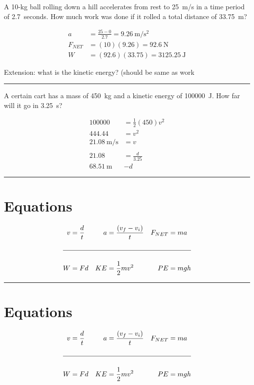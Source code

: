 \documentclass[12pt]{exam}
\begin{document}

\def\mystrut{\protect\rule[-2.2ex]{0ex}{2.2ex}} 
\qformat{ \textbf{Task \#\thequestion}
  \ifthenelse{\equal{\thequestion}{\thequestiontitle}}
    {}
    {: \emph{\thequestiontitle}}
  \mystrut  \hfill}


\begin{questions}


\question
  A 10-kg ball rolling down a hill accelerates from rest to 25~m/s in a time period of 2.7~seconds.  How much work was done if it rolled a total distance of 33.75~m?


  \begin{solution}
    \begin{align*}
      a &= \frac {25-0}{2.7} 
         = \SI{9.26}{\meter\per\second^2} \\
      F_{NET} &= (10)(9.26)
               = \SI{92.6}{\newton} \\
      W &= (92.6)(33.75)
         = \SI{3125.25}{\joule}
    \end{align*}


    Extension: what is the kinetic energy?  (should be same as work
  \end{solution}


\vs \hrule \vs

\question
  A certain cart has a mass of 450~kg and a kinetic energy of \SI{100000}{\joule}.  How far will it go in \SI{3.25}{\second}?

  \begin{solution}
      \begin{align*}
        100000 &= \frac{1}{2}(450)v^2 \\
        444.44 &= v^2 \\
        \SI{21.08}{\meter\per\second}  &= v \\\\
        21.08 &= \frac{d}{3.25} \\
        \SI{68.51}{\meter} &- d
      \end{align*}
  \end{solution}

\vs
\ifprintanswers
  \hrule \vs
\else
  \pagebreak

  \newcommand{\eqsheet}{
    \section*{Equations}
    \begin{align*}
      v &= \frac{d}{t} &
      a &= \frac{\left(v_f-v_i\right)}{t} &
      F_{NET} &= ma \\\\\hline\\
      W &= Fd &
      KE &= \frac{1}{2}mv^2 &
      PE &= mgh
    \end{align*}
  }

  \eqsheet
  
  \vs \hrule \vs

  \eqsheet

  \vs 

\fi



\end{questions}
\end{document}
